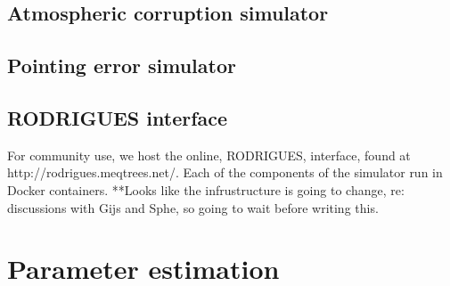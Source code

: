 \subsection{Atmospheric corruption simulator}




\subsection{Pointing error simulator}
\subsection{RODRIGUES interface}
For community use, we host the online, RODRIGUES, interface, found at http://rodrigues.meqtrees.net/. Each of the components of the simulator run in Docker containers. **Looks like the infrustructure is going to change, re: discussions with Gijs and Sphe, so going to wait before writing this.

\section{Parameter estimation}
